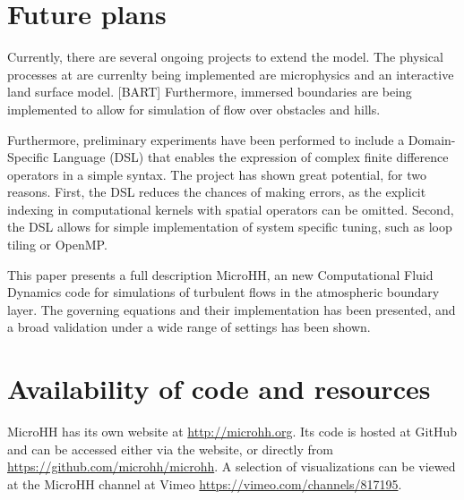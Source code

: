 \documentclass[gmd]{copernicus}
\begin{document}
\section{Future plans}
Currently, there are several ongoing projects to extend the model. The physical processes at are currenlty being implemented are microphysics and an interactive land surface model. [BART] Furthermore, immersed boundaries are being implemented to allow for simulation of flow over obstacles and hills.

Furthermore, preliminary experiments have been performed to include a Domain-Specific Language (DSL) that enables the expression of complex finite difference operators in a simple syntax. The project has shown great potential, for two reasons. First, the DSL reduces the chances of making errors, as the explicit indexing in computational kernels with spatial operators can be omitted. Second, the DSL allows for simple implementation of system specific tuning, such as loop tiling or OpenMP.

\conclusions  \label{sec:conclusion} %
This paper presents a full description MicroHH, an new Computational Fluid Dynamics code for simulations of turbulent flows in the atmospheric boundary layer. The governing equations and their implementation has been presented, and a broad validation under a wide range of settings has been shown.

\section{Availability of code and resources}
MicroHH has its own website at \url{http://microhh.org}. Its code is hosted at GitHub and can be accessed either via the website, or directly from 
\url{https://github.com/microhh/microhh}. A selection of visualizations can be viewed at the MicroHH channel at Vimeo \url{https://vimeo.com/channels/817195}.

\iffalse
\end{document}
